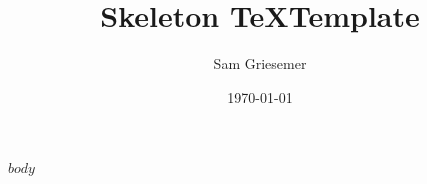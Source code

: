 \documentclass{article}
\title{Skeleton \TeX Template}
\author{Sam Griesemer}
\date{\today}
\begin{document}
\maketitle
\tableofcontents
\newpage

$body$
\end{document}
